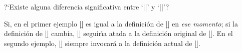 


\bigskip

\enunciadoS ?`Existe alguna diferencia significativa entre
`|\let\a=\b|' y `|\def\a{\b}|'?

\bigskip

\respuestaS Si, en el primer ejemplo |\a| es igual a la definici\'on
de |\b| en {\it ese momento}; si la definici\'on de |\b| cambia, |\a|
seguir\'{\i}a atada a la definici\'on original de |\b|. En el segundo
ejemplo, |\a| siempre invocar\'a a la definici\'on actual de |\b|.

\bye

